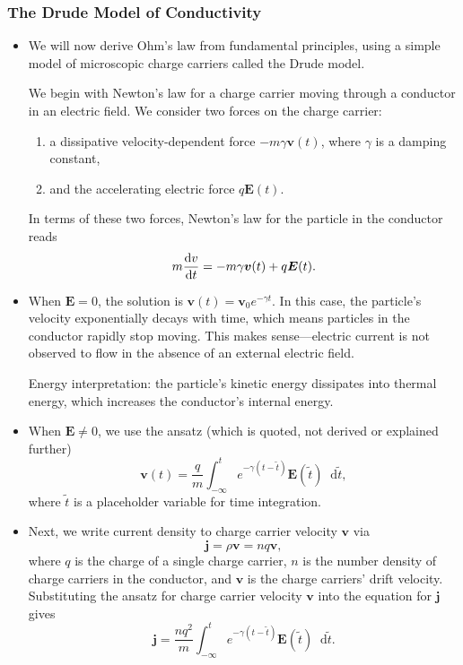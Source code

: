 \documentclass[11pt, a4paper]{article}
\newcommand{\diff}{\mathop{}\!\mathrm{d}} %
\renewcommand{\vec}[1]{\bm{#1}} %
\renewcommand{\t}[1]{\tilde{#1}} %
\newcommand{\E}{\vec{E}} %
\renewcommand{\j}{\vec{j}}  %
\begin{document}
\subsubsection{The Drude Model of Conductivity}
\begin{itemize}
	\item We will now derive Ohm's law from fundamental principles, using a simple model of microscopic charge carriers called the Drude model.
	
	We begin with Newton's law for a charge carrier moving through a conductor in an electric field. We consider two forces on the charge carrier:
	\begin{enumerate}
		\item a dissipative velocity-dependent force $ - m \gamma \vec{v}(t) $, where $ \gamma $ is a damping constant,
		
		\item and the accelerating electric force $ q \E(t) $.
	\end{enumerate}
	In terms of these two forces, Newton's law for the particle in the conductor reads
	\begin{equation*}
		m \dv{v}{t} = - m \gamma \vec{v}(t) + q \E(t).
	\end{equation*}
	
	\item When $ \E = 0 $, the solution is $ \vec{v}(t) = \vec{v}_{0} e^{- \gamma t}$. In this case, the particle's velocity exponentially decays with time, which means particles in the conductor rapidly stop moving. This makes sense---electric current is not observed to flow in the absence of an external electric field.
	
	Energy interpretation: the particle's kinetic energy dissipates into thermal energy, which increases the conductor's internal energy.
	
	\item When $ \E \neq 0 $, we use the ansatz (which is quoted, not derived or explained further)
	\begin{equation*}
		\vec{v}(t) = \frac{q}{m}\int_{-\infty}^{t}e^{-\gamma(t - \t{t})}\E(\t{t}) \diff \t{t},
	\end{equation*}
    where $ \tilde{t} $ is a placeholder variable for time integration.
	
    \item Next, we write current density to charge carrier velocity $ \vec{v} $ via
	\begin{equation*}
		\j = \rho \vec{v} = n q \vec{v},
	\end{equation*}
	where $ q $ is the charge of a single charge carrier, $ n $ is the number density of charge carriers in the conductor, and $ \vec{v} $ is the charge carriers' drift velocity. Substituting the ansatz for charge carrier velocity $ \vec{v} $ into the equation for $ \j $ gives
	\begin{equation*}
		\j = \frac{nq^{2}}{m}\int_{-\infty}^{t}e^{-\gamma(t - \t{t})}\E(\t{t}) \diff \t{t}.
	\end{equation*}
	

\end{itemize}
\end{document}
